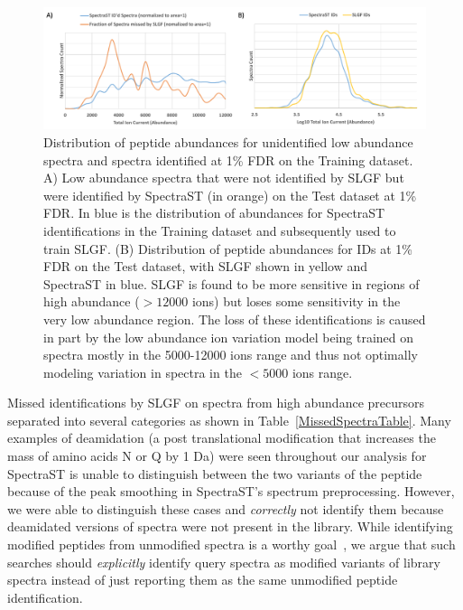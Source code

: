 \documentclass[endnotes,11pt]{article}
\begin{document}
\begin{figure}[!h]
 \centering
	\includegraphics[scale=0.5]{Abundances2.pdf}
	\vspace{-0.1in}
  \caption{Distribution of peptide abundances for unidentified low abundance spectra
  and spectra identified at 1\% FDR on the Training dataset. A) Low abundance spectra that were not identified by SLGF but were identified by SpectraST (in orange) on the Test dataset at 1\% FDR. In blue is the distribution of abundances for SpectraST identifications in the Training dataset and subsequently used to train SLGF. (B) Distribution of peptide abundances for IDs at 1\% FDR on the Test dataset, with SLGF shown in yellow and SpectraST in blue. SLGF is found to be more sensitive in regions of high abundance ($>12000$ ions) but loses some sensitivity in the very low abundance region. The loss of these identifications is caused in part by the low abundance ion variation model being trained on spectra mostly in the 5000-12000 ions range and thus not optimally modeling variation in spectra in the $<5000$ ions range.
  }
	\label{SearchAbundance}
\end{figure}

Missed identifications by SLGF on spectra from high abundance precursors separated into several categories as shown in Table~\ref{MissedSpectraTable}. Many examples of deamidation (a post translational modification that increases the mass of amino acids N or Q by 1 Da) were seen throughout our analysis for SpectraST is unable to distinguish between the two variants of the peptide because of the peak smoothing in SpectraST's spectrum preprocessing. However, we were able to distinguish these cases and {\em correctly} not identify them because deamidated versions of spectra were not present in the library. While identifying modified peptides from unmodified spectra is a worthy goal~\cite{bandeira07pnas}, we argue that such searches should \emph{explicitly} identify query spectra as modified variants of library spectra instead of just reporting them as the same unmodified peptide identification.
\end{document}
